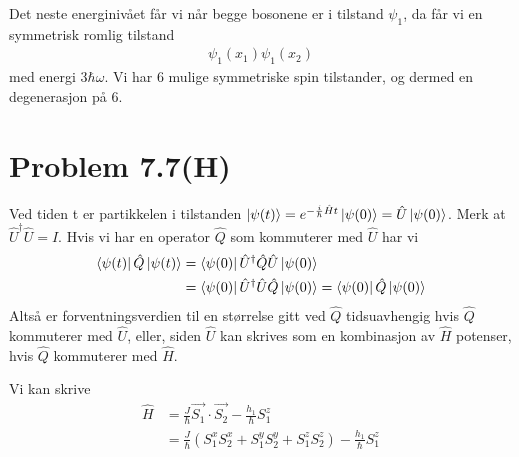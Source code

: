 \documentclass[norsk,a4paper,12pt]{article}
\begin{document}
	Det neste energinivået får vi når begge bosonene er i tilstand $\psi_1$, da får vi en symmetrisk romlig tilstand
	\begin{equation}
	\begin{aligned}
	\psi_1(x_1)\psi_1(x_2)
	\end{aligned}
	\end{equation}
	med energi $3\hbar \omega$. Vi har 6 mulige symmetriske spin tilstander, og dermed en degenerasjon på 6.
	
\section*{Problem 7.7(H)}

	Ved tiden t er partikkelen i tilstanden $\ket{\psi(t)} = e^{-\frac{i}{\hbar}\hat{H}t} \ket{\psi(0)} = \hat{U} \ket{\psi(0)}$. Merk at $\hat{U}^\dagger \hat{U} = \hat{I}$. Hvis vi har en operator $\hat{Q}$ som kommuterer med $\hat{U}$ har vi
	\begin{equation}
	\begin{aligned}
	\bra{\psi(t)} \hat{Q} \ket{\psi(t)} &= \bra{\psi(0)} \hat{U}^\dagger \hat{Q} \hat{U} \ket{\psi(0)} \\
	&= \bra{\psi(0)} \hat{U}^\dagger \hat{U} \hat{Q} \ket{\psi(0)} = \bra{\psi(0)} \hat{Q} \ket{\psi(0)}
	\end{aligned}
	\end{equation}
	Altså er forventningsverdien til en størrelse gitt ved $\hat{Q}$ tidsuavhengig hvis $\hat{Q}$ kommuterer med $\hat{U}$, eller, siden $\hat{U}$ kan skrives som en kombinasjon av $\hat{H}$ potenser, hvis $\hat{Q}$ kommuterer med $\hat{H}$.
	
	Vi kan skrive
	\begin{equation}
	\begin{aligned}
	\hat{H} &= \frac{J}{\hbar} \vec{S_1} \cdot \vec{S_2} - \frac{h_1}{\hbar} S_1^z \\
	&= \frac{J}{\hbar} (S_1^x S_2^x + S_1^y S_2^y + S_1^z S_2^z) - \frac{h_1}{\hbar} S_1^z
	\end{aligned}
	\end{equation}
	
\end{document}
